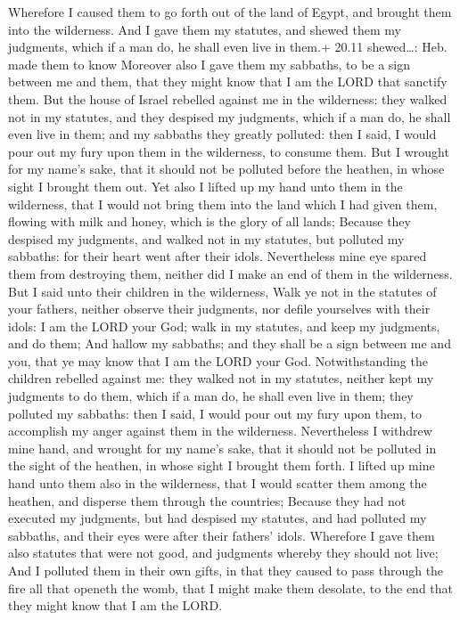  Wherefore I caused them to go forth out of the land of
Egypt, and brought them into the wilderness.  And I gave
them my statutes, and shewed them my judgments, which if a man do, he
shall even live in them.+ 20.11 shewed\ldots: Heb. made them to know
 Moreover also I gave them my sabbaths, to be a sign
between me and them, that they might know that I am the LORD that
sanctify them.  But the house of Israel rebelled against me
in the wilderness: they walked not in my statutes, and they despised my
judgments, which if a man do, he shall even live in them; and my
sabbaths they greatly polluted: then I said, I would pour out my fury
upon them in the wilderness, to consume them.  But I
wrought for my name's sake, that it should not be polluted before the
heathen, in whose sight I brought them out.  Yet also I
lifted up my hand unto them in the wilderness, that I would not bring
them into the land which I had given them, flowing with milk and honey,
which is the glory of all lands;  Because they despised my
judgments, and walked not in my statutes, but polluted my sabbaths: for
their heart went after their idols.  Nevertheless mine eye
spared them from destroying them, neither did I make an end of them in
the wilderness.  But I said unto their children in the
wilderness, Walk ye not in the statutes of your fathers, neither observe
their judgments, nor defile yourselves with their idols:  I
am the LORD your God; walk in my statutes, and keep my judgments, and do
them;  And hallow my sabbaths; and they shall be a sign
between me and you, that ye may know that I am the LORD your God.
 Notwithstanding the children rebelled against me: they
walked not in my statutes, neither kept my judgments to do them, which
if a man do, he shall even live in them; they polluted my sabbaths: then
I said, I would pour out my fury upon them, to accomplish my anger
against them in the wilderness.  Nevertheless I withdrew
mine hand, and wrought for my name's sake, that it should not be
polluted in the sight of the heathen, in whose sight I brought them
forth.  I lifted up mine hand unto them also in the
wilderness, that I would scatter them among the heathen, and disperse
them through the countries;  Because they had not executed
my judgments, but had despised my statutes, and had polluted my
sabbaths, and their eyes were after their fathers' idols. 
Wherefore I gave them also statutes that were not good, and judgments
whereby they should not live;  And I polluted them in their
own gifts, in that they caused to pass through the fire all that openeth
the womb, that I might make them desolate, to the end that they might
know that I am the LORD.

